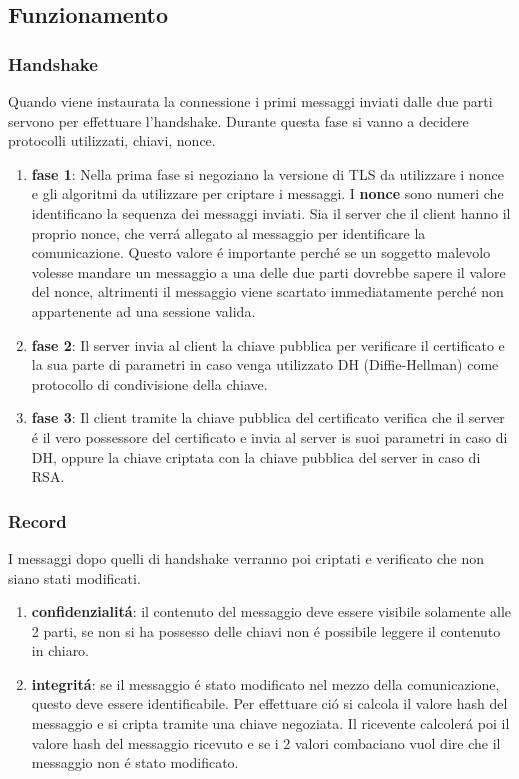 \subsection{Funzionamento}
\subsubsection{Handshake}
Quando viene instaurata la connessione i primi messaggi inviati dalle due parti servono per effettuare l'handshake. Durante questa fase si vanno a decidere protocolli utilizzati, chiavi, nonce.
\begin{enumerate}
  \item \textbf{fase 1}: Nella prima fase si negoziano la versione di TLS da utilizzare i nonce e gli algoritmi da utilizzare per criptare i messaggi. I \textbf{nonce} sono numeri che identificano la sequenza dei messaggi inviati. Sia il server che il client hanno il proprio nonce, che verrá allegato al messaggio per identificare la comunicazione. Questo valore é importante perché se un soggetto malevolo volesse mandare un messaggio a una delle due parti dovrebbe sapere il valore del nonce, altrimenti il messaggio viene scartato immediatamente perché non appartenente ad una sessione valida.
  \item \textbf{fase 2}: Il server invia al client la chiave pubblica per verificare il certificato e la sua parte di parametri in caso venga utilizzato DH (Diffie-Hellman) come protocollo di condivisione della chiave.
  \item \textbf{fase 3}: Il client tramite la chiave pubblica del certificato verifica che il server é il vero possessore del certificato e invia al server is suoi parametri in caso di DH, oppure la chiave criptata con la chiave pubblica del server in caso di RSA.
\end{enumerate}
\subsubsection{Record}
I messaggi dopo quelli di handshake verranno poi criptati e verificato che non siano stati modificati.
\begin{enumerate}
\item \textbf{confidenzialitá}: il contenuto del messaggio deve essere visibile solamente alle 2 parti, se non si ha possesso delle chiavi non é possibile leggere il contenuto in chiaro.
\item \textbf{integritá}: se il messaggio é stato modificato nel mezzo della comunicazione, questo deve essere identificabile. Per effettuare ció si calcola il valore hash del messaggio e si cripta tramite una chiave negoziata. Il ricevente calcolerá poi il valore hash del messaggio ricevuto e se i 2 valori combaciano vuol dire che il messaggio non é stato modificato.
\end{enumerate}

